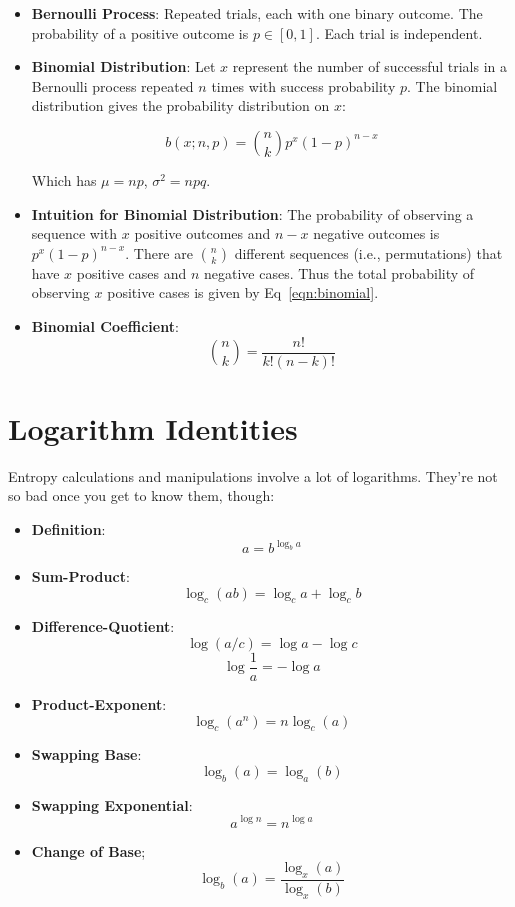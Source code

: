 \documentclass[a4paper,12pt]{report}
\begin{document}
\begin{itemize}

\item \textbf{Bernoulli Process}: Repeated trials, each with one binary outcome.
The probability of a positive outcome is $p\in [0,1]$. Each trial is
independent.
\item \textbf{Binomial Distribution}: Let $x$ represent the number of successful
trials in a Bernoulli process repeated $n$ times with success probability $p$.
The binomial distribution gives the probability distribution on $x$: 

\begin{equation}\label{eqn:binomial}
b(x; n, p) = {n \choose k} p^x (1-p)^{n-x}
\end{equation}

Which has $\mu = np$, $\sigma^2 = npq$.

\item \textbf{Intuition for Binomial Distribution}: The probability of observing
a sequence with $x$ positive outcomes and $n-x$ negative outcomes is $p^x
(1-p)^{n-x}$. There are ${n\choose k}$ different sequences (i.e., permutations)
that have $x$ positive cases and $n$ negative cases. Thus the total probability
of observing $x$ positive cases is given by Eq~\ref{eqn:binomial}.

\item \textbf{Binomial Coefficient}: 
\begin{equation}
\label{eqn:binomial_coeff}
{n\choose k} = \frac{n!} {k! (n-k)!}
\end{equation}

\end{itemize}


\section{Logarithm Identities}

Entropy calculations and manipulations involve a lot of logarithms. They're not
so bad once you get to know them, though: 
\begin{itemize}
\item \textbf{Definition}: $$a = b^{\log_b a}$$
\item \textbf{Sum-Product}: $$\log_c(ab) = \log_c a + \log_c b$$
\item \textbf{Difference-Quotient}: $$\log (a/c) = \log a - \log c$$ 
$$\log \frac 1 a = - \log a$$
\item \textbf{Product-Exponent}: $$\log_c(a^n) = n\log_c(a)$$
\item \textbf{Swapping Base}: $$\log_b(a) = \log_a(b)$$
\item \textbf{Swapping Exponential}: $$a^{\log n} = n^{\log a}$$
\item \textbf{Change of Base}; $$\log_b(a) = \frac{\log_x(a)}{\log_x(b)}$$
\end{itemize}
\end{document}
